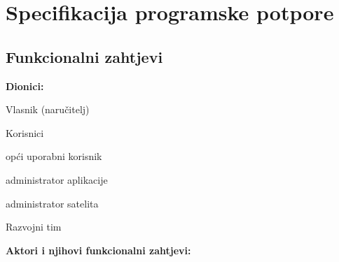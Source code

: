 \chapter{Specifikacija programske potpore}
\graphicspath{{./slike/}}		
	\section{Funkcionalni zahtjevi}
			
			\noindent \textbf{Dionici:}
			
			\begin{packed_enum}
				
				\item Vlasnik (naručitelj)
				\item Korisnici
				      \begin{packed_enum}
						
						\item  opći uporabni korisnik 
						\item  administrator aplikacije
						\item administrator satelita
				
					\end{packed_enum}
				\item Razvojni tim
				
			\end{packed_enum}
			
			\noindent \textbf{Aktori i njihovi funkcionalni zahtjevi:}
			
